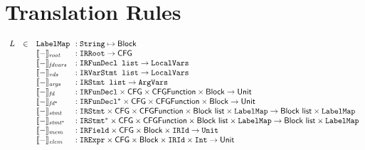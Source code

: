 \section{Translation Rules}
\[
\begin{array}{rll@{~~}l}
L&\in&\TT{LabelMap} &: \TT{String} \mapsto \SF{Block}\\
&&\transfun{-}_{\emph{root}} &: \TT{IRRoot} \rightarrow \SF{CFG} \\
&&\transfun{-}_{\emph{fdvars}} &: \TT{IRFunDecl list} \rightarrow \LocalVars \\
&&\transfun{-}_{\emph{vds}} &: \TT{IRVarStmt list} \rightarrow \LocalVars \\
&&\transfun{-}_{\emph{args}} &: \TT{IRStmt list} \rightarrow \ArgVars \\
&&\transfun{-}_{\emph{fd}} &: \TT{IRFunDecl} \times \SF{CFG} \times \SF{CFGFunction} \times \SF{Block} \rightarrow \SF{Unit} \\
&&\transfun{-}_{\emph{fd}^*} &: \TT{IRFunDecl}^* \times \SF{CFG} \times \SF{CFGFunction} \times \SF{Block} \rightarrow \SF{Unit} \\
&&\transfun{-}_{\emph{stmt}} &: \TT{IRStmt} \times \SF{CFG} \times \SF{CFGFunction} \times \SF{Block list} \times \TT{LabelMap} \rightarrow \SF{Block list} \times \TT{LabelMap}\\
&&\transfun{-}_{\emph{stmt}^*} &: \TT{IRStmt}^* \times \SF{CFG} \times \SF{CFGFunction} \times \SF{Block list} \times \TT{LabelMap} \rightarrow \SF{Block list} \times \TT{LabelMap}\\
&&\transfun{-}_{\emph{mem}} &: \TT{IRField} \times \SF{CFG} \times \SF{Block} \times \TT{IRId} \rightarrow \Unit \\
&&\transfun{-}_{\emph{elem}} &: \TT{IRExpr} \times \SF{CFG} \times \SF{Block} \times \TT{IRId} \times \TT{Int} \rightarrow \SF{Unit} \\

\end{array}
\]

